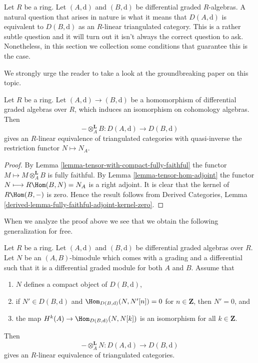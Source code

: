 \noindent
Let $R$ be a ring. Let $(A, \text{d})$ and $(B, \text{d})$ be differential
graded $R$-algebras. A natural question that arises in nature is what
it means that $D(A, \text{d})$ is equivalent to $D(B, \text{d})$
as an $R$-linear triangulated category. This is a rather subtle question
and it will turn out it isn't always the correct question to ask.
Nonetheless, in this section we collection some conditions
that guarantee this is the case.

\medskip\noindent
We strongly urge the reader to take a look at the groundbreaking
paper \cite{Rickard} on this topic.

\begin{lemma}
\label{lemma-qis-equivalence}
Let $R$ be a ring. Let $(A, \text{d}) \to (B, \text{d})$ be a
homomorphism of differential graded algebras over $R$, which induces
an isomorphism on cohomology algebras. Then
$$
- \otimes_A^\mathbf{L} B : D(A, \text{d}) \to D(B, \text{d})
$$
gives an $R$-linear equivalence of triangulated categories with
quasi-inverse the restriction functor $N \mapsto N_A$.
\end{lemma}

\begin{proof}
By Lemma \ref{lemma-tensor-with-compact-fully-faithful}
the functor $M \longmapsto M \otimes_A^\mathbf{L} B$ is
fully faithful. By Lemma \ref{lemma-tensor-hom-adjoint}
the functor $N \longmapsto R\Hom(B, N) = N_A$ is a right adjoint.
It is clear that the kernel of $R\Hom(B, -)$ is zero.
Hence the result follows from
Derived Categories, Lemma
\ref{derived-lemma-fully-faithful-adjoint-kernel-zero}.
\end{proof}

\noindent
When we analyze the proof above we see that we obtain the
following generalization for free.

\begin{lemma}
\label{lemma-tilting-equivalence}
Let $R$ be a ring. Let $(A, \text{d})$ and $(B, \text{d})$ be 
differential graded algebras over $R$. Let $N$ be an $(A, B)$-bimodule
which comes with a grading and a differential such that it is a
differential graded module for both $A$ and $B$. Assume that
\begin{enumerate}
\item $N$ defines a compact object of $D(B, \text{d})$,
\item if $N' \in D(B, \text{d})$ and
$\Hom_{D(B, \text{d})}(N, N'[n]) = 0$ for $n \in \mathbf{Z}$,
then $N' = 0$, and
\item the map $H^k(A) \to \Hom_{D(B, \text{d})}(N, N[k])$ is an
isomorphism for all $k \in \mathbf{Z}$.
\end{enumerate}
Then
$$
- \otimes_A^\mathbf{L} N : D(A, \text{d}) \to D(B, \text{d})
$$
gives an $R$-linear equivalence of triangulated categories.
\end{lemma}


